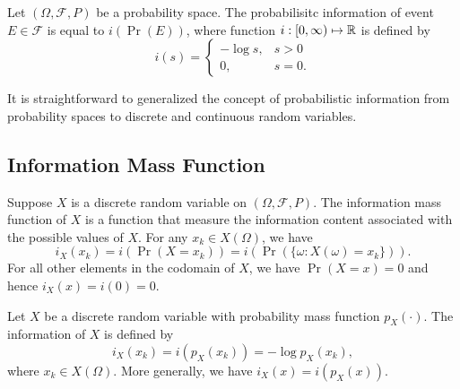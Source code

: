 \begin{definition} \label{definition:ProbabilisticInformation}
Let $(\Omega, \mathcal{F}, P)$ be a probability space.
The probabilisitc information of event $E \in \mathcal{F}$ is equal to $i(\Pr(E))$, where function $i: [0, \infty) \mapsto \mathbb{R}$ is defined by
\begin{equation} \label{equation:InformationFunction}
i(s) = \begin{cases} - \log s, & s > 0 \\
0, & s = 0 . \end{cases}
\end{equation}
\end{definition}

It is straightforward to generalized the concept of probabilistic information from probability spaces to discrete and continuous random variables.


\subsection{Information Mass Function}

Suppose $X$ is a discrete random variable on $(\Omega, \mathcal{F}, P)$.
The information mass function of $X$ is a function that measure the information content associated with the possible values of $X$.
For any $x_k \in X(\Omega)$, we have
\begin{equation*}
i_X (x_k) = i \left( \Pr (X = x_k) \right) = i \left( \Pr \left( \{ \omega : X(\omega) = x_k \} \right) \right) .
\end{equation*}
For all other elements in the codomain of $X$, we have $\Pr (X = x) = 0$ and hence $i_X (x) = i (0) = 0$.

\begin{definition}[IMF]
Let $X$ be a discrete random variable with probability mass function $p_X (\cdot)$.
The information of $X$ is defined by
\begin{equation*}
i_X (x_k) = i \left( p_X (x_k) \right) = - \log p_X (x_k),
\end{equation*}
where $x_k \in X(\Omega)$.
More generally, we have $i_X (x) = i \left( p_X (x) \right)$.
\end{definition}

